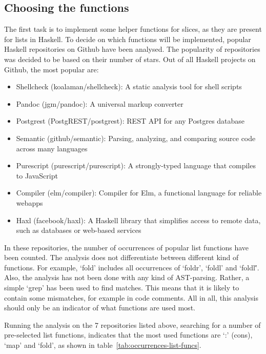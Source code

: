 \subsection{Choosing the functions}

The first task is to implement some helper functions for slices, as they are present
for lists in Haskell. To decide on which functions will be implemented, popular
Haskell repositories on Github have been analysed. The popularity of repositories
was decided to be based on their number of stars. Out of all Haskell projects
on Github, the most popular are\autocite{github-popular-haskell}:

\begin{itemize}
    \item Shellcheck (koalaman/shellcheck\autocite{github-shellcheck}): A static analysis tool for shell scripts
    \item Pandoc (jgm/pandoc\autocite{github-pandoc}): A universal markup converter
    \item Postgrest (PostgREST/postgrest\autocite{github-postgrest}): REST API for any Postgres database
    \item Semantic (github/semantic\autocite{github-semantic}): Parsing, analyzing, and comparing source code across many languages
    \item Purescript (purescript/purescript\autocite{github-purescript}): A strongly-typed language that compiles to JavaScript
    \item Compiler (elm/compiler\autocite{github-elmcompiler}): Compiler for Elm, a functional language for reliable webapps
    \item Haxl (facebook/haxl\autocite{github-haxl}): A Haskell library that simplifies access to remote data, such as databases or web-based services
\end{itemize}

In these repositories, the number of occurrences of popular list functions have
been counted. The analysis does not differentiate between different kind of
functions. For example, `fold' includes all occurrences of `foldr', `foldl' and
`foldl\''. Also, the analysis has not been done with any kind of AST-parsing.
Rather, a simple `grep' has been used to find matches. This means that it is
likely to contain some mismatches, for example in code comments. All in all,
this analysis should only be an indicator of what functions are used most.

Running the analysis on the 7 repositories listed above, searching for a number
of pre-selected list functions, indicates that the most used functions are `:'
(cons), `map' and `fold', as shown in table~\ref{tab:occurrences-list-funcs}.


